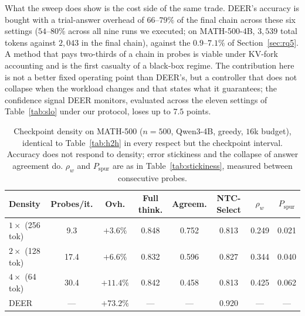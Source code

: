 \documentclass[acmsmall]{acmart}
\newcommand{\dn}[1]{\textcolor{bd}{#1}}
\theoremstyle{acmdefinition}%
\theoremstyle{acmplain}}{}%
\begin{document}
What the sweep does show is the cost side of the same trade. DEER's accuracy is bought with a trial-answer overhead of $66$--$79\%$ of the final chain across these six settings ($54$--$80\%$ across all nine runs we executed; on MATH-500-4B, $3{,}539$ total tokens against $2{,}043$ in the final chain), against the $0.9$--$7.1\%$ of Section~\ref{sec:rq5}. A method that pays two-thirds of a chain in probes is viable under KV-fork accounting and is the first casualty of a black-box regime. The contribution here is not a better fixed operating point than DEER's, but a controller that does not collapse when the workload changes and that states what it guarantees; the confidence signal DEER monitors, evaluated across the eleven settings of Table~\ref{tab:slo} under our protocol, loses up to $7.5$ points.

\begin{table}[t]
\caption{Checkpoint density on MATH-500 ($n{=}500$, Qwen3-4B, greedy, $16$k budget), identical to Table~\ref{tab:h2h} in every respect but the checkpoint interval. Accuracy does not respond to density; error stickiness and the collapse of answer agreement do. $\rho_w$ and $P_{\mathrm{spur}}$ are as in Table~\ref{tab:stickiness}, measured between consecutive probes.}
\label{tab:density}
\small
\setlength{\tabcolsep}{3.6pt}
\begin{tabular}{@{}lccccccc@{}}
\toprule
\textbf{Density} & \textbf{Probes/it.} & \textbf{Ovh.} & \textbf{Full think.} & \textbf{Agreem.} & \textbf{NTC-Select} & $\rho_w$ & $P_{\mathrm{spur}}$ \\
\midrule
$1\times$ (256 tok) & 9.3  & $+3.6\%$  & 0.848 & 0.752 & 0.813 & 0.249 & 0.021 \\
$2\times$ (128 tok) & 17.4 & $+6.6\%$  & 0.832 & \dn{0.596} & 0.827 & \dn{0.344} & \dn{0.040} \\
$4\times$ (64 tok) & 30.4 & $+11.4\%$ & 0.842 & \dn{0.458} & 0.813 & \dn{0.425} & \dn{0.062} \\
\midrule
DEER~\cite{yang2025deer} & --- & $+73.2\%$ & --- & --- & 0.920 & --- & --- \\
\bottomrule
\end{tabular}
\end{table}
\end{document}
